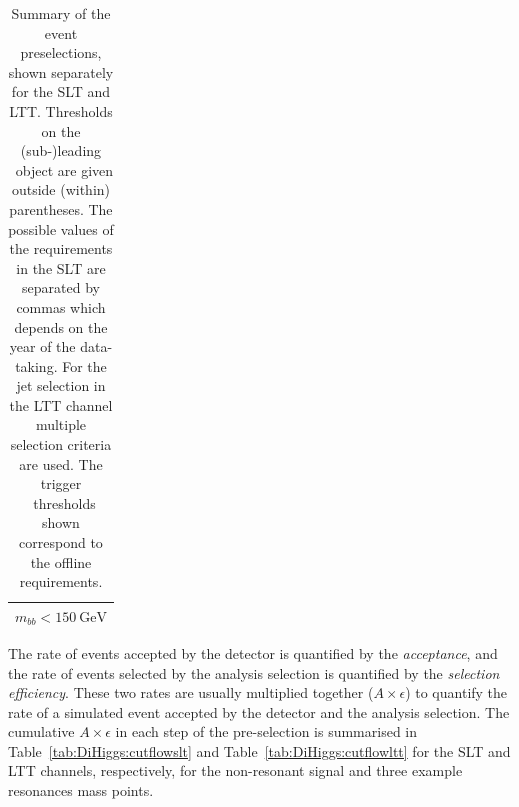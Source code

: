 \begin{table}[htbp]
{\begin{tabular}{C{0.39\textwidth}C{0.39\textwidth}}
   \\
    \bottomrule
    \end{tabular}
    }
    \caption{Summary of the event preselections, 
    shown separately for the SLT and LTT. 
   Thresholds on the (sub-)leading \pt\ object are given 
   outside (within) parentheses. 
   The possible values of the requirements in the SLT are separated by commas
   which depends on the year of the data-taking. 
   For the jet selection in the LTT channel multiple selection criteria are used.
   The trigger \pt\ thresholds shown correspond to the offline requirements.}
   \label{tab:DiHiggs:selectionsummary}
\end{table}


The rate of events accepted by the detector is quantified by the \textit{acceptance},
and the rate of events selected by the analysis selection is quantified by 
the \textit{selection efficiency}.
These two rates are usually multiplied together ($A \times \epsilon$) to quantify the rate of a simulated event
accepted by the detector and the analysis selection. 
The cumulative $A \times \epsilon$ in each step of the pre-selection
is summarised in Table~\ref{tab:DiHiggs:cutflowslt}
and Table~\ref{tab:DiHiggs:cutflowltt}
for the SLT and LTT channels, respectively, for the
non-resonant signal and three example resonances mass points.  


